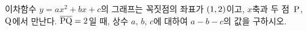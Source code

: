 이차함수 $y=ax^2+bx+c$의 그래프는 꼭짓점의 좌표가 $(1{,}\mkern3mu\mathopen{}2)$이고, $x$축과 두 점~$\mathrm{P}$, $\mathrm{Q}$에서 만난다. $\overline{\mathrm{PQ}}=2$일 때, 상수 $a$, $b$, $c$에 대하여 $a-b-c$의 값을 구하시오.
